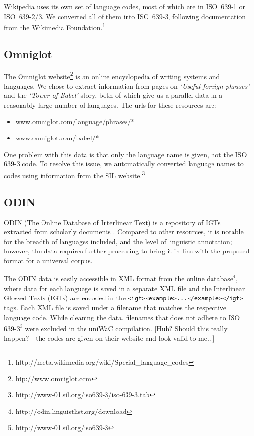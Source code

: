 Wikipedia uses its own set of language codes, most of which are in ISO~639-1 or ISO~639-2/3. We converted all of them into ISO~639-3, following documentation from the Wikimedia Foundation.\footnote{http://meta.wikimedia.org/wiki/Special\_language\_codes}


\subsection{Omniglot}


The Omniglot website\footnote{htp://www.omniglot.com} is an online encyclopedia of writing systems and languages. We chose to extract information from pages on \emph{`Useful foreign phrases'} and the \emph{`Tower of Babel'} story, both of which give us a parallel data in a reasonably large number of languages. The urls for these resources are:

\begin{itemize}[noitemsep]
\item \url{www.omniglot.com/language/phrases/*} 
\item \url{www.omniglot.com/babel/*}
\end{itemize}

\noindent One problem with this data is that only the language name is given, not the ISO 639-3 code. To resolve this issue, we automatically converted language names to codes using information from the SIL website.\footnote{http://www-01.sil.org/iso639-3/iso-639-3.tab}



\subsection{ODIN}


ODIN (The Online Database of Interlinear Text) is a repository of IGTs extracted from scholarly documents \cite{lewis2006odin,lewis2010odin}.  Compared to other resources, it is notable for the breadth of languages included, and the level of linguistic annotation; however, the data requires further processing to bring it in line with the proposed format for a universal corpus.

The ODIN data is easily accessible in XML format from the online database\footnote{http://odin.linguistlist.org/download}, where data for each language is saved in a separate XML file and the Interlinear Glossed Texts (IGTs) are encoded in the \texttt{<igt><example>...</example></igt>} tags. Each XML file is saved under a filename that matches the respective language code. While cleaning the data, filenames that does not adhere to ISO 639-3\footnote{http://www-01.sil.org/iso639-3} were excluded in the uniWaC compilation. [Huh? Should this really happen? - the codes are given on their website and look valid to me...]

